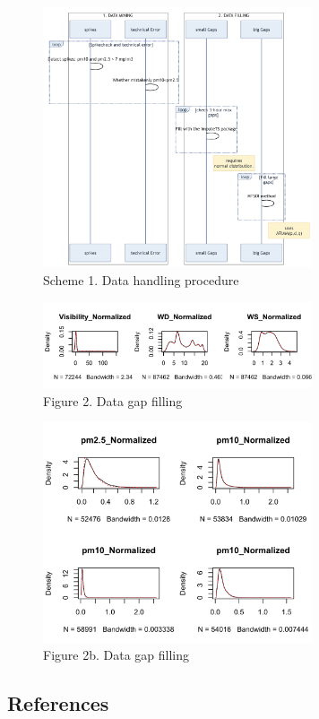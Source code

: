 \documentclass[
  11pt,
]{article}
\begin{document}
\newpage

\begin{figure}
\centering
\includegraphics[width=3.125in,height=\textheight]{images/scheme_1.png}
\caption{Scheme 1. Data handling procedure}
\end{figure}

\newpage

\begin{figure}
\centering
\includegraphics[width=3.125in,height=\textheight]{images/figure_2b.png}
\caption{Figure 2. Data gap filling}
\end{figure}

\begin{figure}
\centering
\includegraphics[width=3.125in,height=\textheight]{images/figure_2c.png}
\caption{Figure 2b. Data gap filling}
\end{figure}

\newpage

\subsection{References}\label{references}
\end{document}

